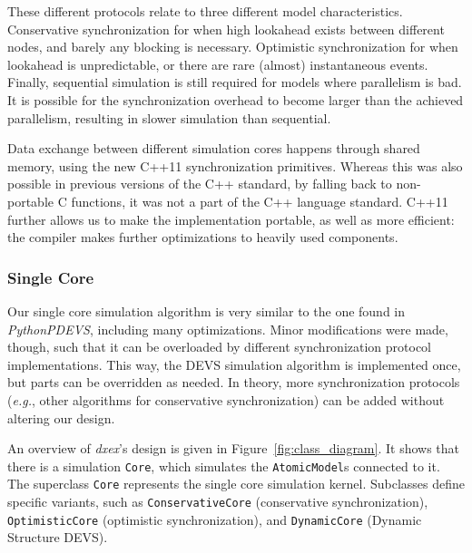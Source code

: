 These different protocols relate to three different model characteristics.
Conservative synchronization for when high lookahead exists between different nodes, and barely any blocking is necessary.
Optimistic synchronization for when lookahead is unpredictable, or there are rare (almost) instantaneous events.
Finally, sequential simulation is still required for models where parallelism is bad. 
It is possible for the synchronization overhead to become larger than the achieved parallelism, resulting in slower simulation than sequential.

Data exchange between different simulation cores happens through shared memory, using the new C++11 synchronization primitives.
Whereas this was also possible in previous versions of the C++ standard, by falling back to non-portable C functions, it was not a part of the C++ language standard.
C++11 further allows us to make the implementation portable, as well as more efficient: the compiler makes further optimizations to heavily used components.

\subsubsection{Single Core}
Our single core simulation algorithm is very similar to the one found in \textit{PythonPDEVS}, including many optimizations.
Minor modifications were made, though, such that it can be overloaded by different synchronization protocol implementations.
This way, the \textsf{DEVS} simulation algorithm is implemented once, but parts can be overridden as needed.
In theory, more synchronization protocols (\textit{e.g.}, other algorithms for conservative synchronization) can be added without altering our design.

An overview of \textit{dxex}'s design is given in Figure~\ref{fig:class_diagram}.
It shows that there is a simulation \texttt{Core}, which simulates the \texttt{AtomicModel}s connected to it.
The superclass \texttt{Core} represents the single core simulation kernel.
Subclasses define specific variants, such as \texttt{ConservativeCore} (conservative synchronization), \texttt{OptimisticCore} (optimistic synchronization), and \texttt{DynamicCore} (\textsf{Dynamic Structure DEVS}).

